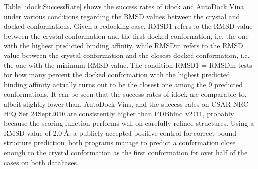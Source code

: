 Table \ref{idock:SuccessRate} shows the success rates of idock and AutoDock Vina under various conditions regarding the RMSD values between the crystal and docked conformations. Given a redocking case, RMSD1 refers to the RMSD value between the crystal conformation and the first docked conformation, i.e. the one with the highest predicted binding affinity, while RMSDm refers to the RMSD value between the crystal conformation and the closest docked conformation, i.e. the one with the minimum RMSD value. The condition RMSD1 = RMSDm tests for how many percent the docked conformation with the highest predicted binding affinity actually turns out to be the closest one among the 9 predicted conformations. It can be seen that the success rates of idock are comparable to, albeit slightly lower than, AutoDock Vina, and the success rates on CSAR NRC HiQ Set 24Sept2010 are consistently higher than PDBbind v2011, probably because the scoring function performs well on carefully refined structures. Using a RMSD value of 2.0 \AA, a publicly accepted positive control for correct bound structure prediction, both programs manage to predict a conformation close enough to the crystal conformation as the first conformation for over half of the cases on both databases.

